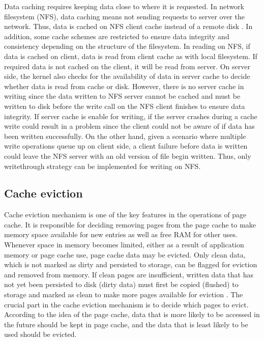 Data caching requires keeping data close to where it is requested. 
In network filesystem (NFS), data caching means not sending requests 
to server over the network. Thus, data is cached on NFS client cache instead 
of a remote disk \cite{eisler2001managing}. 
In addition, some cache schemes are restricted to ensure data integrity and 
consistency depending on the structure of the filesystem.
In reading on NFS, if data is cached on client, data is read from client cache 
as with local filesystem. If required data is not cached on the client, it will be read 
from server. On server side, the kernel also checks for the availability of data in 
server cache to decide whether data is read from cache or disk. 
However, there is no server cache in writing since the data written to NFS server 
cannot be cached and must be written to disk before the write call on the 
NFS client finishes to ensure data integrity. 
If server cache is enable for writing, if the server crashes during a cache write 
could result in a problem since the client could not be aware of if data has 
been written successfully. 
On the other hand, given a scenario where multiple write operations queue up 
on client side, a client failure before data is written could leave the NFS server 
with an old version of file begin written. 
Thus, only writethrough strategy can be implemented for writing on NFS. 

\subsection{Cache eviction}

Cache eviction mechanism is one of the key features in the operations of page cache. 
It is responsible for deciding removing pages from the page cache to make 
memory space available for new entries as well as free RAM for other uses. 
Whenever space in memory becomes limited, either as a result of application 
memory or page cache use, page cache data may be evicted. 
Only clean data, which is not marked as dirty and persisted to storage, can be 
flagged for eviction and removed from memory. 
If clean pages are insufficient, written data that has not yet been persisted to 
disk (dirty data) must first be copied (flushed) to storage and marked as clean 
to make more pages available for eviction \cite{linuxdev3rd2010}. The crucial 
part in the cache eviction mechanism is to decide which pages to evict. 
According to the idea of the page cache, data that is more likely to be accessed 
in the future should be kept in page cache, and the data that is least likely to 
be used should be evicted. 

